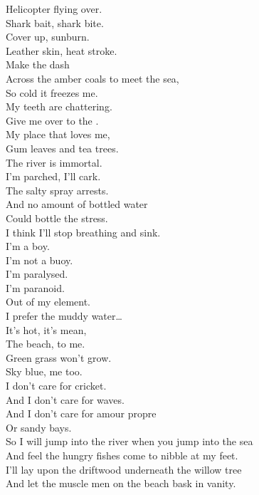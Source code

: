 Helicopter flying over. \\
Shark bait, shark bite. \\
Cover up, sunburn. \\
Leather skin, heat stroke. \\

Make the dash \\
Across the amber coals to meet the sea, \\
So cold it freezes me. \\
My teeth are chattering. \\
Give me over to the . \\
My place that loves me, \\
Gum leaves and tea trees. \\
The river is immortal. \\

I'm parched, I'll cark. \\
The salty spray arrests. \\
And no amount of bottled water \\
Could bottle the stress. \\
I think I'll stop breathing and sink. \\
I'm a boy. \\
I'm not a buoy. \\
I'm paralysed. \\
I'm paranoid. \\
Out of my element. \\

I prefer the muddy water… \\

It's hot, it's mean, \\
The beach, to me. \\
Green grass won't grow. \\
Sky blue, me too. \\

I don't care for cricket. \\
And I don't care for waves. \\
And I don't care for amour propre \\
Or sandy bays. \\

So I will jump into the river when you jump into the sea \\
And feel the hungry fishes come to nibble at my feet. \\
I'll lay upon the driftwood underneath the willow tree \\
And let the muscle men on the beach bask in vanity. \\

